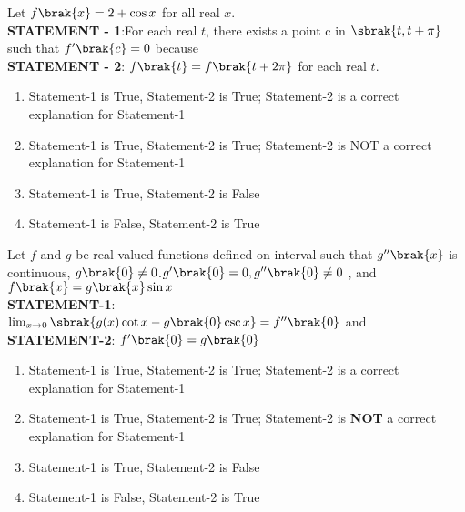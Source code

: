 \iffalse
\title{Assignment}
\author{Y.Harsha Vardhan Reddy}
\section{ar}
\fi
    \item Let $f\brak{x}=2 + \cos{x}$ for all real $x$.\\
    \textbf{STATEMENT - 1}:For each real $t$, there exists a point c in $\sbrak{t,t+\pi}$ such that $f'\brak{c}=0$ because \\
    \textbf{STATEMENT - 2}: $f\brak{t}=f\brak{t+2\pi}$ for each real $t$.
    \hfill{}
    \begin{enumerate}
    
        
    
        \item Statement-1 is True, Statement-2 is True; Statement-2 is a correct explanation for Statement-1
        \item Statement-1 is True, Statement-2 is True; Statement-2 is NOT a correct explanation for Statement-1
        \item Statement-1 is True, Statement-2 is False 
        \item Statement-1 is False, Statement-2 is True
        
    \end{enumerate}
\item Let $f$ and $g$ be real valued functions defined on interval  such that $g''\brak{x}$ is continuous, $g\brak{0}\neq0$.$g'\brak{0}=0, g''\brak{0}\neq0$ , and $f\brak{x}=g\brak{x}\sin{x}$\\
\textbf{STATEMENT-1}:\\
$\lim _{x \to 0}\sbrak{g(x)\cot{x}-g\brak{0}\csc{x}}=f''\brak{0}$ and\\
\textbf{STATEMENT-2}: $f'\brak{0}=g\brak{0}$
\hfill{}
\begin{enumerate}

    

        \item Statement-1 is True, Statement-2 is True; Statement-2 is a correct explanation for Statement-1
        \item Statement-1 is True, Statement-2 is True; Statement-2 is \textbf{NOT} a correct explanation for Statement-1
        \item Statement-1 is True, Statement-2 is False 
        \item Statement-1 is False, Statement-2 is True
        
    \end{enumerate}
